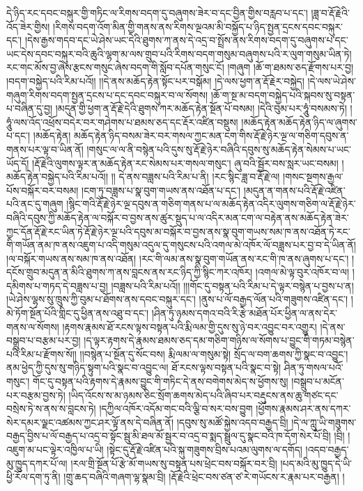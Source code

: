 དེ་ཉིད་རང་དབང་བསྐུར་གྱི་གཏིང་ལ་རིགས་བདག་དུ་བཞུགས་ཟེར་བ་དང་བྱིན་གྱིས་བརླབ་པ་དང་། །ཟླ་བ་རྡོ་རྗེའི་འོད་ཟེར་གྱིས། །རིགས་བདག་འོག་མིན་གྱི་གནས་ནས་རིགས་ལྔའམ་མི་བསྐྱོད་པ་ཉིད་སྤྱན་དྲངས་དབང་བསྐུར་དང་། །དེས་རྒྱས་གདབ་དང་ཡེ་ཤེས་ཡང་དེའི་ཐུགས་ཀ་ནས་དེ་འདྲ་བ་སྤྲོས་ནས་རིགས་བདག་དུ་བཞུགས་པ་དང་ཡང་དེས་དབང་བསྐུར་བའི་ཆུའི་ལྷག་མ་ལས་གྲུབ་པའི་རིགས་བདག་གསུམ་བཞུགས་པའི་ར་ལུག་གསུམ་ཡིན་ཏེ། རང་གང་མོས་བྱ་ཞེས་རྩངས་གསུང་ཞེས་བདག་གི་སློབ་དཔོན་གསུང་ངོ། །གཞུག །ཆོ་ག་ཐམས་ཅད་རྫོགས་པར་བྱ། །བདག་བསྐྱེད་པའི་རིམ་པའོ།། །།དེ་ནས་མཆོད་རྟེན་སྟོང་པར་བསྒོམ། །དེ་ལས་ཕྱག་ན་རྡོ་རྗེར་བསྐྱེད། །དེ་ལས་ཡེ་ཤེས་གཞུག་རིགས་བདག་སྤྱན་དྲངས་པ་དང་དབང་བསྐུར་བ་ལ་སོགས། །ཆོ་ག་སྔ་མ་བདག་བསྐྱེད་པའི་སྐབས་སུ་བསྟན་པ་བཞིན་དུ་བྱ། །མདུན་གྱི་ཕྱག་ན་རྡོ་རྗེ་དེའི་ཐུགས་ཀར་མཆོད་རྟེན་སྔོན་པོ་བསམ། །དེའི་བུམ་པར་ཧཱུཾ་བསམས་ཏེ། །ཧཱུཾ་ལས་འོད་འཕྲོས་བདེར་བར་གཤེགས་པ་ཐམས་ཅད་དང་རྡོར་འཛིན་བསྡུས། །མཆོད་རྟེན་མཆོད་རྟེན་ཉིད་ལ་ཞུགས་པ་དང་། །མཆོད་རྟེན། མཆོད་རྟེན་ཉིད་བསམ་ཟེར་བར་གསལ་ཀྱང་མན་ངག་གིས་རྡོ་རྗེ་ཉེར་ལྔ་ལ་གཅིག་དབུས་ན་གནས་པར་ལྟ་བ་ཡིན་ནོ། །གསུང་ལ་ལ་ནི་བསྙེན་པའི་དུས་སུ་རྡོ་རྗེ་ཉེར་བཞིའི་དབུས་སུ་མཆོད་རྟེན་སེམས་པ་ཡང་ཡོད་དོ། །རྡོ་རྗེའི་ལུགས་ལྟར་ན་མཆོད་རྟེན་རང་སེམས་པར་གསལ་གསུང་། ཞུ་བའི་སྦྱོར་བས་སླར་ཡང་བསམ། །མཆོད་རྟེན་བསྐྱེད་པའི་རིམ་པའོ།། །། དེ་ནས་བཟླས་པའི་རིམ་པ་ནི། །རང་སྙིང་ཟླ་བ་རྡོ་རྗེ་ལ། །གསང་སྔགས་རྒྱལ་པོས་བསྐོར་བར་བསམ། །ངག་ཏུ་བཟླས་པ་སྣ་བུག་གཡས་ནས་འཐོན་པ་དང་། །མདུན་ན་གནས་པའི་རྡོ་རྗེ་འཛིན་པའི་ནང་དུ་གཞུག །སྙིང་གའི་རྡོ་རྗེ་ཉེར་ལྔ་དབུས་ན་གཅིག་གནས་པ་ལ་མཆོད་རྟེན་འདིར་ལུགས་གཅིག་ལ་རྡོ་རྗེ་ཉེར་བཞིའི་དབུས་ཀྱི་མཆོད་རྟེན་ལ་བསྐོར་བ་བྱས་ནས་ཚུར་སྡུད་པ་ལ་འདིར་མན་ངག་ལ་བརྟེན་ནས་མཆོད་རྟེན་ཟེར་ཀྱང་དོན་རྡོ་རྗེ་རང་ཡིན་ཏེ་རྡོ་རྗེ་ཉེར་ལྔ་པའི་དབུས་མ་བསྐོར་བ་བྱས་ནས་སྣ་བུག་གཡས་སམ་ཁ་ནས་འཐོན་ཏེ་རང་གི་གཡོན་ནམ་ཁ་ནས་འཇུག་པ་འདི་གསུམ་འདུལ་དུ་གསུངས་པའི་འགལ་མེ་འཁོར་ལོ་བཟླས་པར་བྱ་བ་དེ་ཡིན་ནོ། །ལ་བསྐོར་གཡས་ནས་སམ་ཁ་ནས་འཐོན། །རང་གི་ལམ་ནས་སྣ་བུག་གཡོན་ནས་རང་གི་ཁ་ནས་ཞུགས་པ་དང་། །དངོས་གྲུབ་མདུན་ན་མིའི་ཐུགས་ཀ་ནས་བླངས་ནས་རང་ཉིད་ཀྱི་སྙིང་ཀར་འཁོར། །འགལ་མེ་ལྟ་བུར་འཁོར་བ་ལ། །དམིགས་པ་གཏད་དེ་བཟླས་པ་བྱ། །བཟླས་པའི་རིམ་པའོ།། །།།གོང་དུ་བསྟན་པའི་རིམ་པ་དེ་ལྟར་བསྙེན་པ་བྱས་པ་ན། །ཡེ་ཤེས་ལྷས་སུ་ཁྲུས་ཀྱི་བུམ་པ་ཐོགས་ནས་དབང་བསྐུར་དང་། །ནུས་པ་ལོ་བརྒྱད་ལོན་པའི་གཟུགས་འཛིན་དང་། །མེ་ཏོག་སྔོན་པོའི་གླིང་དུ་ཕྱིན་ནས་འཐུ་བ་དང་། །ཤིན་ཏུ་ཉམས་དགའ་བའི་རི་རྩེ་མཐོན་པོར་ཕྱིན་ལ་ནས་དེར་གནས་ལ་སོགས། །རྟགས་རྣམས་ཐོ་རངས་ལྟས་བསྟན་པའི་རྨི་ལམ་གྱི་དུས་སུ་ཉེ་བར་འབྱུང་བར་འགྱུར། །དེ་ནས་བསྒྲུབ་པ་བརྩམ་པར་བྱ། །ད་ལྟར་རྟགས་དེ་རྣམས་ཐམས་ཅད་དམ་གཅིག་གཉིས་ལ་སོགས་པ་བྱུང་གི་གཏམ་བསྙེན་པའི་རིམ་པ་རྫོགས་སོ།། །།བསྙེན་པ་སྔོན་དུ་སོང་བས། རྨི་ལམ་ལ་གསུམ་སྟེ། སྲོད་ལ་བག་ཆགས་ཀྱི་སྣང་བ་འབྱུང་། ནམ་ཕྱེད་ཀྱི་དུས་སུ་གཉིད་སྟུག་པའི་སྣང་བ་འབྱུང་ལ། ཐོ་རངས་ལྟས་བསྟན་པའི་སྣང་བ་སྟེ། ཤིན་ཏུ་གསལ་པའོ་གསུང་། གོང་དུ་བསྟན་པའི་རྟགས་དེ་རྣམས་བྱུང་གི་གཏིང་དེ་ནས་བགེགས་མེད་ས་ཕྱོགས་སུ། །བསྒྲུབ་པ་མངོན་པར་བརྩམ་བྱས་ཏེ། །ཡིད་འོངས་ས་མ་ཉམས་ཅིང་སྲོག་ཆགས་མེད་པའི་ཞིབ་པར་བརྡུངས་ནས་ཆུ་གཙང་དང་བསྲེས་ཏེ་ས་ནས་ས་བླངས་ཏེ། །དཀྱིལ་འཁོར་འདོམ་གང་བའི་ལྕི་བ་སར་བས་བྱུག །ཕྱོགས་རྣམས་ཤར་ནས་དཀར་སེར་དམར་ལྗང་འཚམས་ཀྱང་ཤར་ལྟོ་ནས་དེ་བཞིན་ནོ། །དབུས་སུ་མཚོ་སྐྱེས་འདབ་བརྒྱད་བྲི། །དེ་ལ་ཀླུ་ཡི་གཟུགས་བརྒྱད་བྱིས་པ་ལོ་བརྒྱད་པ་འདྲ་བ་སྟོང་སྦུ་མི་ཐལ་མོ་སྦྱར་བ་འདྲ་བ་སྨད་སྦྲུལ་དུ་སྣང་བའི་ཁ་དོག་སེར་པོ་བྲི། །བྲི། །འཇུག་མ་པང་ལྟེར་འཁྱིལ་པ་ཡི། །སྟེང་དུ་རྡོ་རྗེ་འཛིན་པའི་སྐུ་གཟུགས་བྲིས་པའམ་ལུགས་ལ་དགོད། །འདབ་བརྒྱད་མུ་ཁྱུད་དཀར་པོ་ལ། །རལ་གྲི་སྔོན་པོ་རྩེ་མོ་གཡས་སུ་བསྟན་པས་ཕྲེང་བས་བསྐོར་བར་བྲི། །པད་མའི་མུ་ཁྱུད་དེ་ཡི་ཕྱི་རོལ་དག་ཏུ་ནི། །གྲུ་ཆད་བཞིའི་གཞག་ལྷ་སྣམ་བྲི། །རྡོ་རྗེའི་ཕྲེང་བས་ཙན་ཙ་རེ་གཡོངས་ར་རྣམ་པར་བརྒྱན། །

